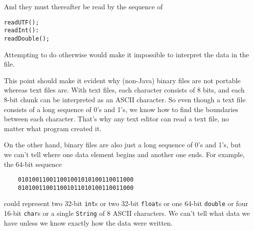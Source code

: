\noindent And they must thereafter be read by the sequence of

\begin{jjjlisting}
\begin{lstlisting}
readUTF();
readInt():
readDouble();
\end{lstlisting}
\end{jjjlisting}

\noindent Attempting to do otherwise would make it impossible to interpret
the data in the file.

This point should make it evident why (non-Java) binary files are not portable
whereas text files are.  With text files, each character consists of 8
bits, and each 8-bit chunk can be interpreted as an ASCII character.
So even though a text file consists of a long sequence of 0's and
1's, we know how to find the boundaries between each character.  That's
why any text editor can read a text file, no matter what program
created it.

On the other hand, binary files are also just a long sequence of 0's
and 1's, but we can't tell where one data element begins and another
one ends.  For example, the  64-bit sequence

\begin{jjjlisting}
\begin{lstlisting}
    010100110011001001010100110011000
    010100110011001011010100110011000
\end{lstlisting}
\end{jjjlisting}

\noindent could represent two 32-bit {\tt int}s or two 32-bit {\tt float}s or
one 64-bit \mbox{\tt double} or four 16-bit {\tt char}s or a single
{\tt String} of 8 ASCII characters.  We can't tell what data we have unless
we know exactly how the data were written.




